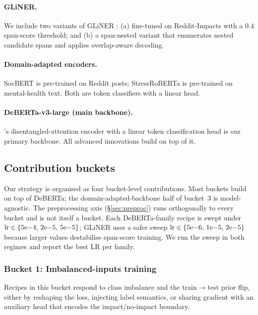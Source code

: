 \documentclass[11pt]{article}
\begin{document}
\paragraph{GLiNER.} We include two variants of GLiNER
\citep{zaratiana2024gliner}: (a) fine-tuned on Reddit-Impacts with a
$0.4$ span-score threshold; and (b) a span-nested variant that
enumerates nested candidate spans and applies overlap-aware decoding.

\paragraph{Domain-adapted encoders.} SocBERT \citep{guo2023socbert} is
pre-trained on Reddit posts; StressRoBERTa \citep{stressroberta2022} is
pre-trained on mental-health text. Both are token classifiers with a
linear head.

\paragraph{DeBERTa-v3-large (main backbone).}
\citet{he2023debertav3}'s disentangled-attention encoder with a linear
token classification head is our primary backbone. All advanced
innovations build on top of it.

\subsection{Contribution buckets}

Our strategy is organised as four bucket-level contributions. Most
buckets build on top of DeBERTa; the domain-adapted-backbone half of
bucket~3 is model-agnostic. The preprocessing axis
(\S\ref{sec:preproc}) runs orthogonally to every bucket and is not
itself a bucket. Each DeBERTa-family
recipe is swept under
$\mathrm{lr}\in\{5{\rm e}{-4},\,2{\rm e}{-5},\,5{\rm e}{-5}\}$; GLiNER
uses a safer sweep
$\mathrm{lr}\in\{5{\rm e}{-6},\,1{\rm e}{-5},\,2{\rm e}{-5}\}$ because
larger values destabilise span-score training. We run the sweep in
both regimes and report the best LR per family.

\subsubsection{Bucket 1: Imbalanced-inputs training}

Recipes in this bucket respond to class imbalance and the train$\to$test
prior flip, either by reshaping the loss, injecting label semantics, or
sharing gradient with an auxiliary head that encodes the
impact/no-impact boundary.
\end{document}

